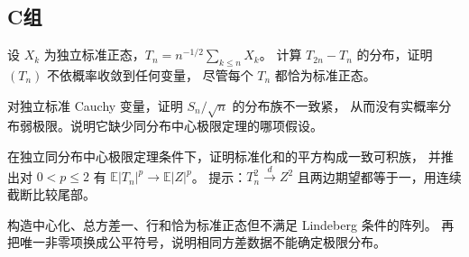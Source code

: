 \subsection*{C组}
\begin{enumerate}[label=\textbf{\thechapter.\arabic*.},resume]
设 $X_k$ 为独立标准正态，$T_n=n^{-1/2}\sum_{k\le n}X_k$。
计算 $T_{2n}-T_n$ 的分布，证明 $(T_n)$ 不依概率收敛到任何变量，
尽管每个 $T_n$ 都恰为标准正态。

对独立标准 Cauchy 变量，证明 $S_n/\sqrt n$ 的分布族不一致紧，
从而没有实概率分布弱极限。说明它缺少同分布中心极限定理的哪项假设。

在独立同分布中心极限定理条件下，证明标准化和的平方构成一致可积族，
并推出对 $0<p\le2$ 有 $\mathbb E|T_n|^p\to\mathbb E|Z|^p$。
提示：$T_n^2\xrightarrow dZ^2$ 且两边期望都等于一，用连续截断比较尾部。

构造中心化、总方差一、行和恰为标准正态但不满足 Lindeberg 条件的阵列。
再把唯一非零项换成公平符号，说明相同方差数据不能确定极限分布。
\end{enumerate}
